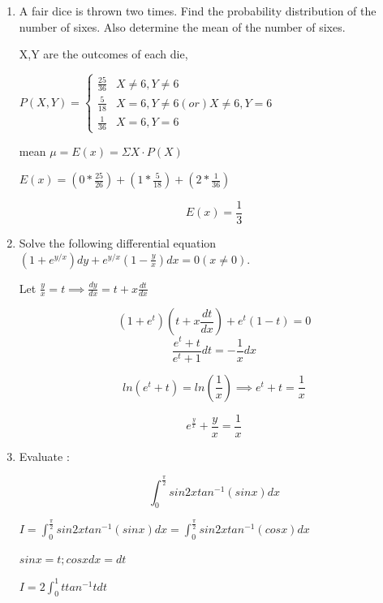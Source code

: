 \begin{enumerate}[label=\thesubsection.\arabic*, ref=\thesubsection.\theenumi]
\solution

$\frac{x-5}{3}=y=2-z=k \implies x=3k+5 ,y=k,z=2-k$

substituting them in the plane equation gives, \newline $3k+5-5k-2(2-k)-1 =0 \implies 0=0 $, so the line lies in the plane 

\item

A fair dice is thrown two times. Find the probability distribution of the number of sixes. Also determine the mean of the number of sixes.

\solution

X,Y are the outcomes of each die,

$P(X,Y)=\begin{cases}
    \frac{25}{36}& X\neq6,Y\neq6 \\ \frac{5}{18}&X=6,Y\neq6 (or )X \neq 6 ,Y=6 \\ \frac{1}{36} & X=6 ,Y=6\end{cases}  $
    
mean $\mu= E(x) =\Sigma X\cdot P(X)$

$E(x)= (0* \frac{25}{26})+(1*\frac{5}{18})+(2*\frac{1}{36})$

$$E(x)=\frac{1}{3}$$

\item 

Solve the following differential equation \newline $(1+e^{y/x})dy+e^{y/x}(1-\frac{y}{x})dx=0(x\ne0).$

\solution

Let $\frac{y}{x} =t \implies \frac{dy}{dx} =t + x\frac{dt}{dx} $

$$(1+e^t)(t+x\frac{dt}{dx})+ e^t(1-t) =0$$  $$\frac{e^t +t}{e^t+1}dt=-\frac{1}{x}dx$$

$$ln(e^t + t)=ln(\frac{1}{x}) \implies e^t + t= \frac{1}{x} $$

$$e^{\frac{y}{x}} + \frac{y}{x} = \frac{1}{x}$$

\item 

Evaluate : 

$$ \int_0^\frac{\pi}{2}sin2xtan^{-1}(sinx)dx$$

\solution

$I=\int_0^\frac{\pi}{2} sin2xtan^{-1}(sinx)dx=\int_0^\frac{\pi}{2}sin2xtan^{-1}(cosx)dx$

$sinx=t; cosxdx=dt$


$I=2\int_0^1ttan^{-1}tdt$  


\end{enumerate}

